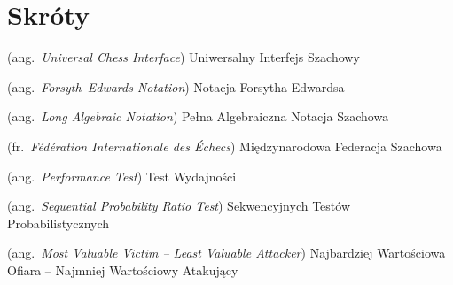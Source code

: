 %
\chapter*{Skróty}
\label{sec:skroty}
\noindent\vspace{-\topsep-\partopsep-\parsep} %
\begin{description}[labelwidth=*]
  \item [UCI] (ang.\ \emph{Universal Chess Interface}) Uniwersalny Interfejs Szachowy
  \item [FEN] (ang.\ \emph{Forsyth–Edwards Notation}) Notacja Forsytha-Edwardsa
  \item [LAN] (ang.\ \emph{Long Algebraic Notation}) Pełna Algebraiczna Notacja Szachowa
  \item [FIDE] (fr.\ \emph{Fédération Internationale des Échecs}) Międzynarodowa Federacja Szachowa
  \item [Perft] (ang.\ \emph{Performance Test}) Test Wydajności
  \item [SPRT] (ang.\ \emph{Sequential Probability Ratio Test}) Sekwencyjnych Testów Probabilistycznych
  \item [MVV-LVA] (ang.\ \emph{Most Valuable Victim – Least Valuable Attacker}) Najbardziej Wartościowa Ofiara – Najmniej Wartościowy Atakujący
\end{description}


